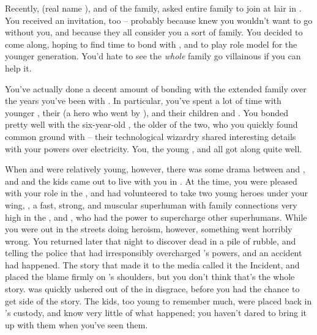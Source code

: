 \documentclass[char]{LRSguildcamp1}
\begin{document}
Recently, \cGrandma{\MYsupername} (real name \cGrandma{\intro}), \cGrandma{\villain} and \cGrandma{\familyleader} of the \cGrandma{\formal} family, asked \cGrandma{\their} entire family to join \cGrandma{\them} at \cGrandma{\their} lair in \pCityGrandma{}.  You received an invitation, too -- probably because \cGrandma{\they} knew you wouldn't want \cGrad{} to go without you, and because they all consider you a sort of family.  You decided to come along, hoping to find time to bond with \cGrad{}, and to play role model for the younger generation.  You'd hate to see the \emph{whole} family go villainous if you can help it.

You've actually done a decent amount of bonding with the extended family over the years you've been with \cOldest{}.  In particular, you've spent a lot of time with \cOldest{\their} younger \cArchitect{\sibling} \cArchitect{\intro}, their \cAS{\spouse} \cAS{\intro} (a hero who went by \cAS{\MYsupername}), and their children \cTeen{} and \cTween{}. You bonded pretty well with the six-year-old \cTeen{}, the older of the two, who you quickly found common ground with -- their technological wizardry shared interesting details with your powers over electricity.  You, the young \cTeen{}, and \cAS{} all got along quite well.

When \cTeen{} and \cTween{} were relatively young, however, there was some drama between \cArchitect{} and \cAS{}, and \cAS{} and the kids came out to live with you in \pCityO{}.  At the time, you were pleased with your role in the \cHeroLeague{\intro}, and had volunteered to take two young heroes under your wing, \cJuggernaut{}, a fast, strong, and muscular superhuman with family connections very high in the \cHeroLeague{}, and \cYSOldName{}, who had the power to supercharge other superhumans.  While you were out in the streets doing heroism, however, something went horribly wrong.  You returned later that night to discover \cAS{} dead in a pile of rubble, and \cJuggernaut{} telling the police that \cYSOldName{} had irresponsibly overcharged \cJuggernaut{}'s powers, and an accident had happened.  The story that made it to the media called it the \pCityO{} Incident, and placed the blame firmly on \cYSOldName{}'s shoulders, but you don't think that's the whole story.  \cYSOldName{} was quickly ushered out of the \cHeroLeague{} in disgrace, before you had the chance to get \cYS{\their} side of the story.  The kids, too young to remember much, were placed back in \cArchitect{}'s custody, and know very little of what happened; you haven't dared to bring it up with them when you've seen them.
\end{document}
